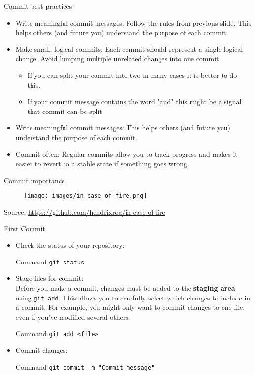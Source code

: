 \documentclass{beamer}
\begin{document}
\begin{frame}{Commit best practices}
  \begin{itemize}
    \item Write meaningful commit messages: Follow the rules from previous slide. This helps others (and future you) understand the purpose of each commit.
    \item Make small, logical commits: Each commit should represent a single logical change. Avoid lumping multiple unrelated changes into one commit.
      \begin{itemize}
        \item If you can split your commit into two in many cases it is better to do this.
        \item If your commit message contains the word "and" this might be a signal that commit can be split
      \end{itemize}
    \item Write meaningful commit messages: This helps others (and future you) understand the purpose of each commit.
    \item Commit often: Regular commits allow you to track progress and makes it easier to revert to a stable state if something goes wrong.
  \end{itemize}
\end{frame}

\begin{frame}{Commit importance}
  \begin{figure}[h]
    \centering
    \texttt{[image: images/in-case-of-fire.png]}
    \label{fig:in-case-of-fire}
  \end{figure}
  {\footnotesize Source: \href{https://github.com/hendrixroa/in-case-of-fire}{https://github.com/hendrixroa/in-case-of-fire}}
\end{frame}

\begin{frame}{First Commit}
  \begin{itemize}
      \item Check the status of your repository:
      \begin{block}{Command}
        \texttt{git status}
      \end{block}
      \item Stage files for commit:\\
        Before you make a commit, changes must be added to the \textbf{staging area} using \texttt{git add}. This allows you to carefully select which changes to include in a commit. For example, you might only want to commit changes to one file, even if you've modified several others.
      \begin{block}{Command}
        \texttt{git add <file>}
      \end{block}
      \item Commit changes:
      \begin{block}{Command}
          \texttt{git commit -m "Commit message"}
      \end{block}
  \end{itemize}
\end{frame}
\end{document}
